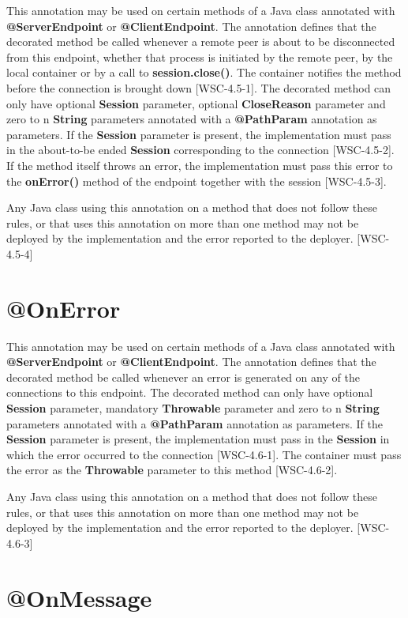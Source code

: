 This annotation may be used on certain methods of a Java class annotated with \textbf{@ServerEndpoint} or \textbf{@ClientEndpoint}. The annotation defines that the decorated method be called whenever a remote peer is about to be disconnected from this endpoint, whether that process is initiated by the remote peer, by the local container or by a call to \textbf{session.close()}. The container notifies the method before the connection is brought down [WSC-4.5-1]. The decorated method can only have optional \textbf{Session} parameter, optional \textbf{CloseReason} parameter and zero to n \textbf{String} parameters annotated with a \textbf{@PathParam} annotation as parameters. If the \textbf{Session} parameter is present, the implementation must pass in the about-to-be ended \textbf{Session} corresponding to the connection [WSC-4.5-2]. If the method itself throws an error, the implementation must pass this error to the \textbf{onError()} method of the endpoint together with the session [WSC-4.5-3].

Any Java class using this annotation on a method that does not follow these rules, or that uses this annotation on more than one method may not be deployed by the implementation and the error reported to the deployer. [WSC-4.5-4]

\section{@OnError}

This annotation may be used on certain methods of a Java class annotated with \textbf{@ServerEndpoint} or \textbf{@ClientEndpoint}. The annotation defines that the decorated method be called whenever an error is generated on any of the connections to this endpoint. The decorated method can only have optional \textbf{Session} parameter, mandatory \textbf{Throwable} parameter and zero to n \textbf{String} parameters annotated with a \textbf{@PathParam} annotation as parameters. If the \textbf{Session} parameter is present, the implementation must pass in the \textbf{Session} in which the error occurred to the connection [WSC-4.6-1]. The container must pass the error as the \textbf{Throwable} parameter to this method [WSC-4.6-2].

Any Java class using this annotation on a method that does not follow these rules, or that uses this annotation on more than one method may not be deployed by the implementation and the error reported to the deployer. [WSC-4.6-3]

\section{@OnMessage}

